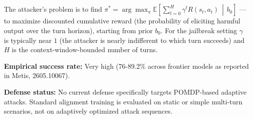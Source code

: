 \documentclass[
  11pt,
]{article}
\begin{document}
The attacker's problem is to find
\(\pi^* = \arg\max_\pi \mathbb{E}\!\left[\sum_{t=0}^{H} \gamma^{t} R(s_t, a_t) \,\middle|\, b_0\right]\)
--- to maximize discounted cumulative reward (the probability of eliciting
harmful output over the turn horizon), starting from prior \(b_0\). For
the jailbreak setting \(\gamma\) is typically near \(1\) (the attacker is
nearly indifferent to which turn succeeds) and \(H\) is the
context-window-bounded number of turns.

\textbf{Empirical success rate:} Very high (76-89.2\% across frontier
models as reported in Metis, 2605.10067).

\textbf{Defense status:} No current defense specifically targets
POMDP-based adaptive attacks. Standard alignment training is evaluated
on static or simple multi-turn scenarios, not on adaptively optimized
attack sequences.
\end{document}
